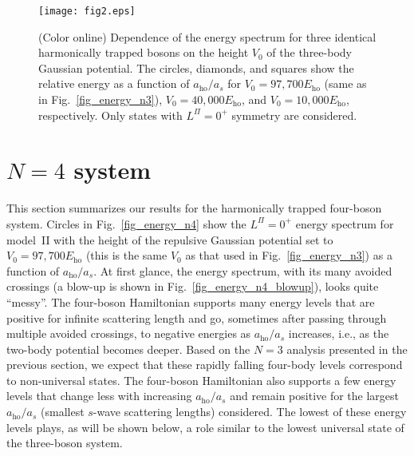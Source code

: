 \documentclass[aps,pra,twocolumn,showpacs,superscriptaddress]{revtex4}
\begin{document}
\begin{figure}[t]
  \vspace*{0.1in}
\centering
\texttt{[image: fig2.eps]}
\vspace*{.5in}
\caption{(Color online)
  Dependence of the energy spectrum for three identical
  harmonically
trapped 
bosons on
the height $V_0$ of the three-body Gaussian potential.
The circles, diamonds, and squares show 
the relative energy as a function of $a_{\text{ho}}/a_s$
for $V_0=97,700 E_{\text{ho}}$ (same as in Fig.~\protect\ref{fig_energy_n3}),
$V_0=40,000 E_{\text{ho}}$, and $V_0=10,000 E_{\text{ho}}$,
respectively.
Only states with $L^{\Pi}=0^+$ symmetry are considered.
}\label{fig_energy_n3_2}
\end{figure}
  
\section{$N=4$ system}
\label{sec_n4}

This section summarizes our results for the harmonically trapped
four-boson system.
Circles in Fig.~\ref{fig_energy_n4} show the $L^{\Pi}=0^+$
energy spectrum for model~II
with the height of the repulsive Gaussian potential
set to $V_0=97,700 E_{\text{ho}}$
(this is the same $V_0$ as that used
in Fig.~\ref{fig_energy_n3})
as a function of $a_{\text{ho}}/a_s$.
At first glance, the energy spectrum, with its many avoided crossings
(a blow-up is shown in Fig.~\ref{fig_energy_n4_blowup}),
looks quite
``messy''.
The four-boson Hamiltonian supports many energy levels that are positive 
for infinite scattering length and go, sometimes after
passing through multiple avoided crossings, to negative energies
as $a_{\text{ho}}/a_s$ increases, i.e., as the two-body potential
becomes deeper. 
Based on the $N=3$ analysis presented in the previous section,
we expect that these rapidly falling four-body levels
correspond to non-universal states.
The four-boson Hamiltonian also supports a few energy levels that
change less with increasing $a_{\text{ho}}/a_s$ and remain positive 
for the largest $a_{\text{ho}}/a_s$ (smallest $s$-wave scattering lengths)
considered.
The lowest of these energy levels plays, as will be 
shown below, a role similar to
the lowest universal state of the three-boson system.
\end{document}
